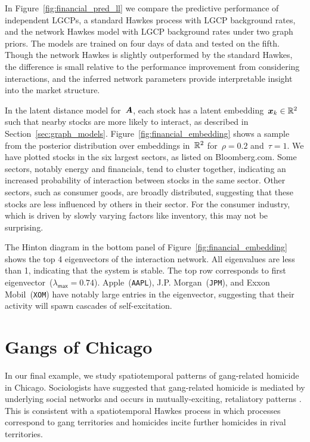 \textbf{}
In Figure~\ref{fig:financial_pred_ll} we compare the predictive performance of independent LGCPs, a standard Hawkes process with LGCP background rates, and the network Hawkes model with LGCP background rates under two graph priors. The models are trained on four days of data and tested on the fifth. Though the network Hawkes is slightly outperformed by the standard Hawkes, the difference is small relative to the performance improvement from considering interactions, and the inferred network parameters provide interpretable insight into the market structure.

In the latent distance model for~$\boldsymbol{A}$, each stock has a latent embedding~${\boldsymbol{x}_k\in\mathbb{R}^2}$ such that nearby stocks are more likely to interact, as described in Section~\ref{sec:graph_models}. Figure~\ref{fig:financial_embedding} shows a sample from the posterior distribution over embeddings in~$\mathbb{R}^2$ for~${\rho=0.2}$ and~${\tau=1}$. We have plotted stocks in the six largest sectors, as listed on Bloomberg.com. Some sectors, notably energy and financials, tend to cluster together, indicating an increased probability of interaction between stocks in the same sector. Other sectors, such as consumer goods, are broadly distributed, suggesting that these stocks are less influenced by others in their sector. For the consumer industry, which is driven by slowly varying factors like inventory, this may not be surprising.  

The Hinton diagram in the bottom panel of Figure~\ref{fig:financial_embedding} shows the top 4 eigenvectors of the interaction network. All eigenvalues are less than 1, indicating that the system is stable. The top row corresponds to first eigenvector~(${\lambda_{\mathsf{max}}=0.74}$). Apple~(\texttt{AAPL}), J.P. Morgan~(\texttt{JPM}), and Exxon Mobil~(\texttt{XOM}) have notably large entries in the eigenvector, suggesting that their activity will spawn cascades of self-excitation. 

\section{Gangs of Chicago}
\label{sec:chicago}
In our final example, we study spatiotemporal patterns of gang-related homicide in Chicago. Sociologists have suggested that gang-related homicide is mediated by underlying social networks and occurs in mutually-exciting, retaliatory patterns \cite{Papachristos-2009}. This is consistent with a spatiotemporal Hawkes process in which processes correspond to gang territories and homicides incite further homicides in rival territories.


